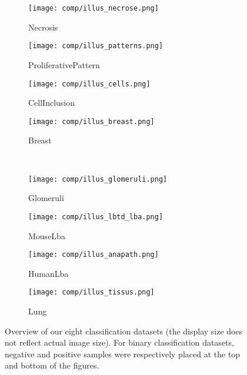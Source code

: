 \begin{figure}
    \centering
    \begin{subfigure}[t]{0.225\textwidth}
        \centering
        \texttt{[image: comp/illus\_necrose.png]}
        \caption{Necrosis}
        \label{sfig:comp:dataset:necrosis}
    \end{subfigure}
    \begin{subfigure}[t]{0.225\textwidth}
        \centering
        \texttt{[image: comp/illus\_patterns.png]}
        \caption{ProliferativePattern}
        \label{sfig:comp:dataset:proliferativepattern}
    \end{subfigure}
    \begin{subfigure}[t]{0.225\textwidth}
        \centering
        \texttt{[image: comp/illus\_cells.png]}
        \caption{CellInclusion}
        \label{sfig:comp:dataset:cellinclusion}
    \end{subfigure}
    \begin{subfigure}[t]{0.225\textwidth}
        \centering
        \texttt{[image: comp/illus\_breast.png]}
        \caption{Breast}
        \label{sfig:comp:dataset:breast}
    \end{subfigure} \\
    \begin{subfigure}[t]{0.225\textwidth}
        \centering
        \texttt{[image: comp/illus\_glomeruli.png]}
        \caption{Glomeruli}
        \label{sfig:comp:dataset:glomeruli}
    \end{subfigure}
    \begin{subfigure}[t]{0.225\textwidth}
        \centering
        \texttt{[image: comp/illus\_lbtd\_lba.png]}
        \caption{MouseLba}
        \label{sfig:comp:dataset:mouselba}
    \end{subfigure}
    \begin{subfigure}[t]{0.225\textwidth}
        \centering
        \texttt{[image: comp/illus\_anapath.png]}
        \caption{HumanLba}
        \label{sfig:comp:dataset:humanlba}
    \end{subfigure}
    \begin{subfigure}[t]{0.225\textwidth}
        \centering
        \texttt{[image: comp/illus\_tissus.png]}
        \caption{Lung}
        \label{sfig:comp:dataset:lung}
    \end{subfigure}
    \caption{Overview of our eight classification datasets (the display size does not reflect actual image size). For binary classification datasets, negative and positive samples were respectively placed at the top and bottom of the figures.}
    \label{fig:comp:dataset_samples}
\end{figure}
 


